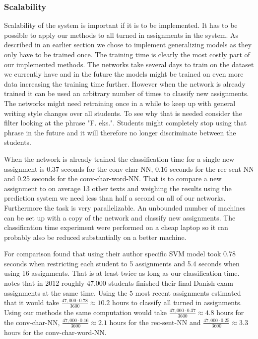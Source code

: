 \subsubsection{Scalability}

Scalability of the system is important if it is to be implemented. It has to be
possible to apply our methods to all turned in assignments in the system. As
described in an earlier section we chose to implement generalizing models as
they only have to be trained once. The training time is clearly the most costly
part of our implemented methods. The networks take several days to train on
the dataset we currently have and in the future the models might be trained on
even more data increasing the training time further. However when the network
is already trained it can be used an arbitrary number of times to classify
new assignments. The networks might need retraining once in a while to keep
up with general writing style changes over all students. To see why that is
needed consider the filter looking at the phrase "F. eks.". Students might
completely stop using that phrase in the future and it will therefore no longer
discriminate between the students.

When the network is already trained the classification time for a single new
assignment is 0.37 seconds for the \gls{conv-char-NN}, 0.16 seconds for the
\gls{rec-sent-NN} and 0.25 seconds for the \gls{conv-char-word-NN}. That is to
compare a new assignment to on average 13 other texts and weighing the results
using the prediction system we need less than half a second on all of our
networks. Furthermore the task is very parallelizable. An unbounded number of
machines can be set up with a copy of the network and classify new assignments.
The classification time experiment were performed on a cheap laptop so it can
probably also be reduced substantially on a better machine.

For comparison \citet{hansen2014} found that using their author specific
\gls{SVM} model took 0.78 seconds when restricting each student to 5 assignments
and 5.4 seconds when using 16 assignments. That is at least twice as long as
our classification time. \citet{hansen2014} notes that in 2012 roughly 47.000
students finished their final Danish exam assignments at the same time. Using
the 5 most recent assignments \citet{hansen2014} estimated that it would take
$\frac{47,000 \cdot 0.78}{3600} \approx 10.2$ hours to classify all turned in
assignments. Using our methods the same computation would take $\frac{47,000
\cdot 0.37}{3600} \approx 4.8$ hours for the \gls{conv-char-NN}, $\frac{47,000
\cdot 0.16}{3600} \approx 2.1$ hours for the \gls{rec-sent-NN} and $\frac{47,000
\cdot 0.25}{3600} \approx 3.3$ hours for the \gls{conv-char-word-NN}.

